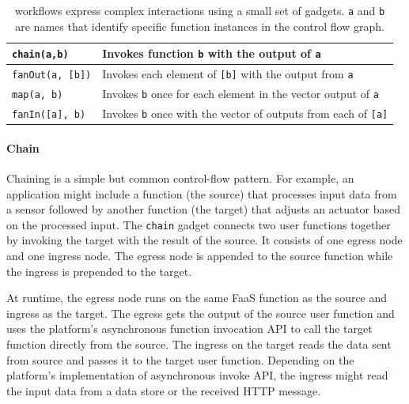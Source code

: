 \begin{table}[t!]
	\centering
	\begin{tabular}{ |m{8em}| m{13em} | }
		\hline
		\texttt{chain(a,b) }& Invokes function \texttt{b} with the output of \texttt{a} \\
		\hline
		\texttt{fanOut(a, [b])} & Invokes each element of \texttt{[b]} with the output from \texttt{a} \\
		\hline
		\texttt{map(a, b)} & Invokes \texttt{b} once for each element in the vector output of \texttt{a} \\
		\hline
		\texttt{fanIn([a], b)} & Invokes \texttt{b} once with the vector of outputs from each of \texttt{[a]} \\
		\hline
	\end{tabular}
	\caption{\name{} workflows express complex interactions using a small set of
		gadgets. \texttt{a} and \texttt{b} are names that identify specific function
		instances in the control flow graph.}
	\label{tab:gadgets}
\end{table}


\paragraph{Chain}
Chaining is a simple but common control-flow pattern. For example, an
application might include a function (the source) that processes input data
from a sensor followed by another function (the target) that adjusts an
actuator based on the processed input. The \texttt{chain} gadget connects two
user functions together by invoking the target with the result of the source.
It consists of one egress node and one ingress node. The egress node is
appended to the source function while the ingress is prepended to the target.

At runtime, the egress node runs on the same FaaS function as the source and
ingress as the target. The egress gets the output of the source user function
and uses the platform's asynchronous function invocation API to call the
target function directly from the source. The ingress on the target reads the
data sent from source and passes it to the target user function. Depending on
the platform's implementation of asynchronous invoke API, the ingress might
read the input data from a data store or the received HTTP message.


